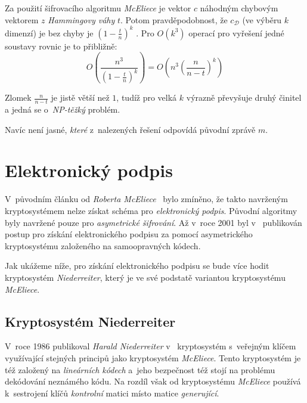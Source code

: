 \documentclass[thesis=M,czech,hidelinks]{FITthesis}[2012/06/26]
\newcommand{\0}{{\textcolor[gray]{0.75}{0}}}
\begin{document}
Za použití šifrovacího algoritmu \emph{McEliece} je vektor $c$ 
náhodným chybovým vektorem $z$ \emph{Hammingovy váhy} $t$. Potom
pravděpodobnost, že $c_{\mathcal{D}}$ (ve výběru $k$ dimenzí) je bez chyby je
$\left(1-\frac{t}{n}\right)^k$ \cite{McEliece}. Pro $O\left(k^3\right)$ operací
pro vyřešení jedné soustavy rovnic je to přibližně:
$$
    O\left( \frac{n^3}{\left(1-\frac{t}{n}\right)^k} \right) =
    O\left( n^3 \left(\frac{n}{n-t}\right)^k \right)
$$

Zlomek $\frac{n}{n-t}$ je jistě větší než $1$, tudíž pro velká $k$ výrazně
převyšuje druhý činitel a jedná se o~\emph{NP-těžký} problém.

Navíc není jasné, \emph{které} z~nalezených řešení odpovídá původní zprávě $m$.





\chapter{Elektronický podpis}\label{kap_podpis}

V~původním článku od \emph{Roberta McEliece}~\cite{McEliece} bylo zmíněno, že
takto navrženým kryptosystémem nelze získat schéma pro \emph{elektronický
podpis}.  Původní algoritmy byly navržené pouze pro \emph{asymetrické
šifrování}. Až v~roce 2001 byl v~\cite{Courtois} publikován postup pro získání
elektronického podpisu za pomocí asymetrického kryptosystému založeného na
samoopravných kódech.

Jak ukážeme níže, pro získání elektronického podpisu se bude více hodit
kryptosystém \emph{Niederreiter}, který je ve své podstatě variantou
kryptosystému \emph{McEliece}.



\section{Kryptosystém Niederreiter}\label{kap_niederreiter}

V~roce 1986 publikoval \emph{Harald Niederreiter} v~\cite{Niederreiter}
kryptosystém s~veřejným klíčem využívající stejných principů jako kryptosystém
\emph{McEliece}. Tento kryptosystém je též založený na \emph{lineárních kódech}
a~jeho bezpečnost též stojí na problému dekódování neznámého kódu. Na rozdíl
však od kryptosystému \emph{McEliece} používá k~sestrojení klíčů
\emph{kontrolní} matici místo matice \emph{generující}.
\end{document}
